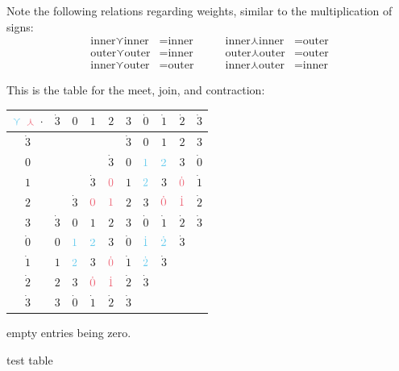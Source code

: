 \documentclass[\ifafour a4paper,12pt,\else a5paper,10pt,\fi%
onecolumn,oneside,article,%
british%
]{memoir}
\theoremstyle{remark}
\theoremstyle{innote}
\renewcommand*{\|}{\nonscript\,\vert\nonscript\;\mathopen{}}
\newcommand*{\ve}{\curlyvee}
\newcommand*{\we}{\curlywedge}
\newcommand*{\+}{\boxplus}
\newcommand*{\ywp}{\dot{0}}
\newcommand*{\ywl}{\dot{1}}
\newcommand*{\ywa}{\dot{2}}
\newcommand*{\ywv}{\dot{3}}
\newcommand*{\zr}{\color{myred}}
\newcommand*{\zb}{\color{myblue}}
\begin{document}
\bigskip

Note the following relations regarding weights, similar to the
multiplication of signs:
\begin{equation}
  \label{eq:parities_products}
  \begin{aligned}
    \text{inner}\ve\text{inner}&=\text{inner}
    &\qquad
      \text{inner}\we\text{inner}&=\text{outer}
\\
    \text{outer}\ve\text{outer}&=\text{inner}
    &\qquad
    \text{outer}\we\text{outer}&=\text{outer}
    \\
    \text{inner}\ve\text{outer}&=\text{outer}
&\qquad
    \text{inner}\we\text{outer}&=\text{inner}
  \end{aligned}
\end{equation}

This is the table for the meet, join, and contraction:

{\centering
  \begin{tabular}{c|ccccccccc}
    $\zb\ve$ $\zr\we$ $\cdot$&$\ywv$&$0$&$1$&$2$&$3$ 
& $\ywp$&$\ywl$&$\ywa$&$\ywv$  \\
    \midrule
 $\ywv$&&&&&$\ywv$
&$0$&$1$&$2$&$3$ \\
$0$&& &&$\ywv$&$0$
&$\zb1$&$\zb2$&$3$&$\ywp$ \\
$1$&&&$\ywv$&$\zr0$&$1$ 
&$\zb2$&$3$&$\zr\ywp$&$\ywl$ \\
$2$&&$\ywv$&$\zr0$&$\zr1$&$2$ 
&$3$&$\zr\ywp$&$\zr\ywl$&$\ywa$ \\
 $3$&$\ywv$&$0$&$1$&$2$&$3$ 
&$\ywp$&$\ywl$&$\ywa$&$\ywv$ \\
%    
 $\ywp$&$0$&$\zb1$&$\zb2$&$3$&$\ywp$
&$\zb\ywl$&$\zb\ywa$&$\ywv$&\\
 $\ywl$&$1$&$\zb2$&$3$&$\zr\ywp$&$\ywl$
&$\zb\ywa$&$\ywv$&&\\
 $\ywa$&$2$&$3$&$\zr\ywp$&$\zr\ywl$&$\ywa$
&$\ywv$&&&\\
 $\ywv$&$3$&$\ywp$ &$\ywl$&$\ywa$&$\ywv$
&&&&
  \end{tabular}

}
empty entries being zero.

\bigskip

test table
\end{document}
